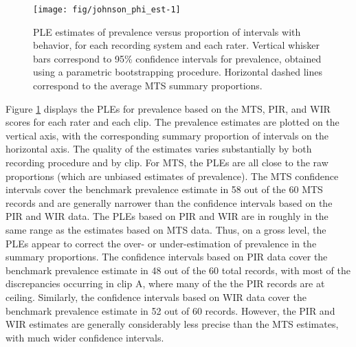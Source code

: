 \documentclass[man, noextraspace, floatsintext]{apa6}\usepackage[]{graphicx}\usepackage[]{color}
\newenvironment{knitrout}{}{} %
\begin{document}
\begin{knitrout}
\color{fgcolor}\begin{figure}[tb]

{\centering \texttt{[image: fig/johnson\_phi\_est-1]} 

}

\caption[PLE estimates of prevalence versus proportion of intervals with behavior, for each recording system and each rater]{PLE estimates of prevalence versus proportion of intervals with behavior, for each recording system and each rater. Vertical whisker bars correspond to 95\% confidence intervals for prevalence, obtained using a parametric bootstrapping procedure. Horizontal dashed lines correspond to the average MTS summary proportions.}\label{fig:johnson_phi_est}
\end{figure}


\end{knitrout}

Figure \ref{fig:johnson_phi_est} displays the PLEs for prevalence based on the MTS, PIR, and WIR scores for each rater and each clip. 
The prevalence estimates are plotted on the vertical axis, with the corresponding summary proportion of intervals on the horizontal axis. 
The quality of the estimates varies substantially by both recording procedure and by clip. 
For MTS, the PLEs are all close to the raw proportions (which are unbiased estimates of prevalence). 
The MTS confidence intervals cover the benchmark prevalence estimate in 58 out of the 60 MTS records and are generally narrower than the confidence intervals based on the PIR and WIR data.
The PLEs based on PIR and WIR are in roughly in the same range as the estimates based on MTS data. 
Thus, on a gross level, the PLEs appear to correct the over- or under-estimation of prevalence in the summary proportions. 
The confidence intervals based on PIR data cover the benchmark prevalence estimate in 48 out of the 60 total records, with most of the discrepancies occurring in clip A, where many of the the PIR records are at ceiling. 
Similarly, the confidence intervals based on WIR data cover the benchmark prevalence estimate in 52 out of 60 records. 
However, the PIR and WIR estimates are generally considerably less precise than the MTS estimates, with much wider confidence intervals.
\end{document}
